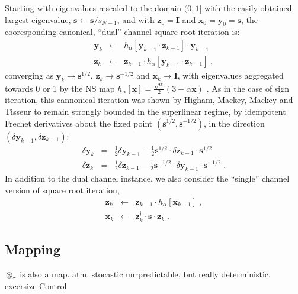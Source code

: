 \documentclass[letterpaper,twocolumn,amsmath,amsfont,amssymb,english,aps,jcp,preprintnumbers,groupaddress,nofootinbib,tightenlines,floatfix]{revtex4}
\newcommand{\mat}[1]{\boldsymbol{#1}}
\newcommand{\ot}{  {\scriptstyle \otimes}_{ \tau } }
\theoremstyle{plain}
\theoremstyle{remark}
\theoremstyle{plain}
\begin{document}
Starting with eigenvalues rescaled to the domain $(0,1]$ with the easily obtained 
largest eigenvalue,   $\mat{s} \leftarrow \mat{s}/s_{N-1}$, and with $\mat{z}_0=\mat{I}$ and 
$\mat{x}_0=\mat{y}_0=\mat{s}$, the cooresponding canonical,  ``dual'' channel square root iteration is:
\begin{eqnarray}\label{cannonical}
\mat{y}_k &\leftarrow& h_\alpha \left[ \mat{y}_{k-1} \cdot \mat{z}_{k-1} \right] \cdot \mat{y}_{k-1}  \nonumber \\
\mat{z}_k &\leftarrow& \mat{z}_{k-1} \cdot h_\alpha \left[ \mat{y}_{k-1} \cdot \mat{z}_{k-1} \right] \; ,
\end{eqnarray}
converging as ${\mat{y}}_k \rightarrow \mat{s}^{1/2}$, ${\mat{z}}_k \rightarrow \mat{s}^{-1/2}$ and
${\mat{x}}_k \rightarrow {\mat{I}}$, with eigenvalues aggregated towards 0 or 1 by 
the NS map $h_\alpha[\mat{x}]=\frac{\sqrt{\alpha}}{2} \left(3-\alpha \mat{x} \right)$ \cite{}.  
As in the case of sign iteration, this cannonical iteration was shown by Higham, Mackey, Mackey and
Tisseur \cite{Higham2005} to remain strongly bounded in the superlinear regime, by idempotent Frechet derivatives about the fixed point
$\left(\mat{s}^{1/2},\mat{s}^{-1/2}\right)$, in the direction $\left(
\delta \mat{y}_{k-1} , \delta \mat{z}_{k-1} \right)$:
\begin{eqnarray}
\delta \mat{y}_k &=& \frac{1}{2} \delta \mat{y}_{k-1} - \frac{1}{2} \mat{s}^{1/2} \cdot \delta \mat{z}_{k-1} \cdot \mat{s}^{1/2} \\
\delta \mat{z}_k &=& \frac{1}{2} \delta \mat{z}_{k-1} - \frac{1}{2} \mat{s}^{-1/2} \cdot \delta \mat{y}_{k-1} \cdot \mat{s}^{-1/2} \;.
\end{eqnarray}
In addition to the dual channel instance, we also consider the ``single'' channel version of square root iteration,
\begin{eqnarray}\label{single}
\mat{z}_k &\leftarrow& \mat{z}_{k-1} \cdot h_\alpha \left[ \mat{x}_{k-1} \right] \; , \nonumber \\
\mat{x}_k &\leftarrow&  \mat{z}^\dagger_{k} \cdot \mat{s} \cdot \mat{z}_{k} \; .
\end{eqnarray}

\subsection{Mapping}\label{map}

$\ot$ is also a map.  atm, stocastic unrpredictable, but really deterministic.  excersize Control
\end{document}
